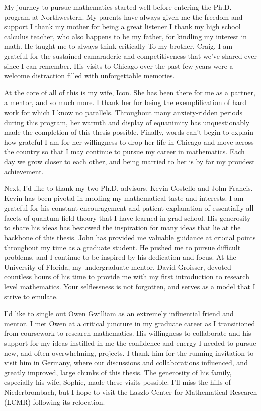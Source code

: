 My journey to pursue mathematics started well before entering the Ph.D. program at Northwestern.
My parents have always given me the freedom and support 
I thank my mother for being a great listener 
I thank my high school calculus teacher, who also happens to be my father, for kindling my interest in math.
He taught me to always think critically
To my brother, Craig, I am grateful for the sustained camaraderie and competitiveness that we've shared ever since I can remember. 
His visits to Chicago over the past few years were a welcome distraction filled with unforgettable memories.

At the core of all of this is my wife, Icon.
She has been there for me as a partner, a mentor, and so much more.
I thank her for being the exemplification of hard work for which I know no parallels. 
Throughout many anxiety-ridden periods during this program, her warmth and display of equanimity has unquestionably made the completion of this thesis possible.
Finally, words can't begin to explain how grateful I am for her willingness to drop her life in Chicago and move across the country so that I may continue to pursue my career in mathematics. 
Each day we grow closer to each other, and being married to her is by far my proudest achievement.

Next, I'd like to thank my two Ph.D. advisors, Kevin Costello and John Francis. 
Kevin has been pivotal in molding my mathematical taste and interests. 
I am grateful for his constant encouragement and patient explanation of essentially all facets of quantum field theory that I have learned in grad school.
His generosity to share his ideas has bestowed the inspiration for many ideas that lie at the backbone of this thesis.  
John has provided me valuable guidance at crucial points throughout my time as a graduate student.
He pushed me to pursue difficult problems, and I continue to be inspired by his dedication and focus. 
At the University of Florida, my undergraduate mentor, David Groisser, devoted countless hours of his time to provide me with my first introduction to research level mathematics. 
Your selflessness is not forgotten, and serves as a model that I strive to emulate. 

I'd like to single out Owen Gwilliam as an extremely influential friend and mentor.
I met Owen at a critical juncture in my graduate career as I transitioned from coursework to research mathematics. 
His willingness to collaborate and his support for my ideas instilled in me the confidence and energy I needed to pursue new, and often overwhelming, projects. 
I thank him for the running invitation to visit him in Germany, where our discussions and collaborations influenced, and greatly improved, large chunks of this thesis. 
The generosity of his family, especially his wife, Sophie, made these visits possible.
I'll miss the hills of Niederbrombach, but I hope to visit the Laszlo Center for Mathematical Research (LCMR) following its relocation.
 
